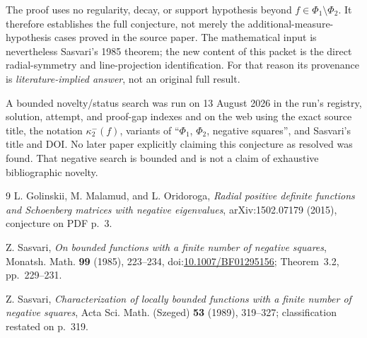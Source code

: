 \documentclass[11pt]{article}
\begin{document}
The proof uses no regularity, decay, or support hypothesis beyond
$f\in\Phi_1\setminus\Phi_2$.  It therefore establishes the full conjecture,
not merely the additional-measure-hypothesis cases proved in the source
paper.  The mathematical input is nevertheless Sasvari's 1985 theorem; the
new content of this packet is the direct radial-symmetry and line-projection
identification.  For that reason its provenance is
\emph{literature-implied answer}, not an original full result.

A bounded novelty/status search was run on 13 August 2026 in the run's
registry, solution, attempt, and proof-gap indexes and on the web using the
exact source title, the notation $\kappa_2^-(f)$, variants of
``$\Phi_1$, $\Phi_2$, negative squares'', and Sasvari's title and DOI.  No
later paper explicitly claiming this conjecture as resolved was found.  That
negative search is bounded and is not a claim of exhaustive bibliographic
novelty.

\begin{thebibliography}{9}
L. Golinskii, M. Malamud, and L. Oridoroga,
\emph{Radial positive definite functions and Schoenberg matrices with
negative eigenvalues}, arXiv:1502.07179 (2015), conjecture on PDF p.~3.

Z. Sasvari,
\emph{On bounded functions with a finite number of negative squares},
Monatsh. Math. \textbf{99} (1985), 223--234,
doi:\href{https://doi.org/10.1007/BF01295156}{10.1007/BF01295156};
Theorem~3.2, pp.~229--231.

Z. Sasvari,
\emph{Characterization of locally bounded functions with a finite number of
negative squares}, Acta Sci. Math. (Szeged) \textbf{53} (1989), 319--327;
classification restated on p.~319.
\end{thebibliography}
\end{document}
